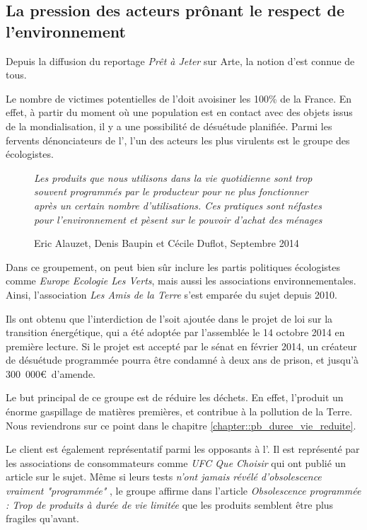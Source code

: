 \subsection{La pression des acteurs prônant le respect de l'environnement }

Depuis la diffusion du reportage \textit{Prêt à Jeter} sur Arte, la notion d'\op est connue de tous. 

Le nombre de victimes potentielles de l'\op doit avoisiner les 100\% de la France. En effet, à partir du moment où une population est en contact avec des objets issus de la mondialisation, il y a une possibilité de désuétude planifiée. 
Parmi les fervents dénonciateurs de l'\op, l'un des acteurs les plus virulents est le groupe des écologistes. 

\begin{wrapfigure}{r}{0.3\textwidth}
\vspace{0.1cm}\og  \textit{Les produits que nous utilisons dans la vie quotidienne sont trop souvent programmés par le producteur pour ne plus fonctionner après un certain nombre d'utilisations. Ces pratiques sont néfastes pour l'environnement et pèsent sur le pouvoir d'achat des ménages} \fg{} \caption{Eric Alauzet, Denis Baupin et Cécile Duflot, Septembre 2014}
\end{wrapfigure}

Dans ce groupement, on peut bien sûr inclure les partis politiques écologistes  comme \textit{Europe Ecologie Les Verts}, mais aussi les associations environnementales. Ainsi, l'association \textit{Les Amis de la Terre} s'est emparée du sujet depuis 2010. 

Ils ont obtenu que l'interdiction de l'\op soit ajoutée dans le projet de loi sur la transition énergétique, qui a été adoptée par l'assemblée le 14 octobre 2014 en première lecture. Si le projet est accepté par le sénat en février 2014, un créateur de désuétude programmée pourra être condamné à deux ans de prison, et jusqu'à 300~000\euro~d'amende. 

Le but principal de ce groupe est de réduire les déchets. En effet, l'\op produit un énorme gaspillage de matières premières, et contribue à la pollution de la Terre. Nous reviendrons sur ce point dans le chapitre \ref{chapter::pb_duree_vie_reduite}.

\medbreak
Le client est également représentatif parmi les opposants à l'\op. Il est  représenté par les associations de consommateurs comme \textit{UFC Que Choisir} qui ont publié un article \cite{ufc_OP} sur le sujet. Même si leurs tests \og \textit{n'ont jamais révélé d’obsolescence vraiment "programmée" }  \fg{}  , le groupe affirme dans l'article \textit{Obsolescence programmée : Trop de produits à durée de vie limitée } que les produits semblent être plus fragiles qu'avant.


